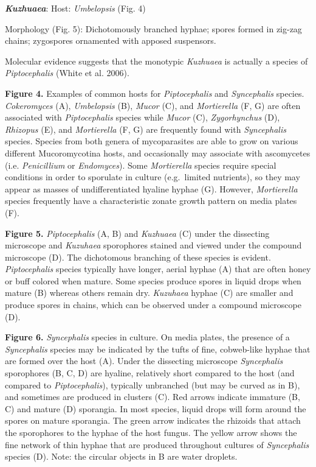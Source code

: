 \documentclass[]{book}
\begin{document}
\textbf{\emph{Kuzhuaea}}: Host: \emph{Umbelopsis} (Fig. 4)

Morphology (Fig. 5): Dichotomously branched hyphae; spores formed in
zig-zag chains; zygospores ornamented with apposed suspensors.

Molecular evidence suggests that the monotypic \emph{Kuzhuaea} is
actually a species of \emph{Piptocephalis} (White et al. 2006).

\textbf{Figure 4.} Examples of common hosts for \emph{Piptocephalis} and
\emph{Syncephalis} species. \emph{Cokeromyces} (A), \emph{Umbelopsis}
(B), \emph{Mucor} (C), and \emph{Mortierella} (F, G) are often
associated with \emph{Piptocephalis} species while \emph{Mucor} (C),
\emph{Zygorhynchus} (D), \emph{Rhizopus} (E), and \emph{Mortierella} (F,
G) are frequently found with \emph{Syncephalis} species. Species from
both genera of mycoparasites are able to grow on various different
Mucoromycotina hosts, and occasionally may associate with ascomycetes
(i.e. \emph{Penicillium} or \emph{Endomyces}). Some \emph{Mortierella}
species require special conditions in order to sporulate in culture
(e.g.~limited nutrients), so they may appear as masses of
undifferentiated hyaline hyphae (G). However, \emph{Mortierella} species
frequently have a characteristic zonate growth pattern on media plates
(F).

\textbf{Figure 5.} \emph{Piptocephalis} (A, B) and \emph{Kuzhuaea} (C)
under the dissecting microscope and \emph{Kuzuhaea} sporophores stained
and viewed under the compound microscope (D). The dichotomous branching
of these species is evident. \emph{Piptocephalis} species typically have
longer, aerial hyphae (A) that are often honey or buff colored when
mature. Some species produce spores in liquid drops when mature (B)
whereas others remain dry. \emph{Kuzuhaea} hyphae (C) are smaller and
produce spores in chains, which can be observed under a compound
microscope (D).

\textbf{Figure 6.} \emph{Syncephalis} species in culture. On media
plates, the presence of a \emph{Syncephalis} species may be indicated by
the tufts of fine, cobweb-like hyphae that are formed over the host (A).
Under the dissecting microscope \emph{Syncephalis} sporophores (B, C, D)
are hyaline, relatively short compared to the host (and compared to
\emph{Piptocephalis}), typically unbranched (but may be curved as in B),
and sometimes are produced in clusters (C). Red arrows indicate immature
(B, C) and mature (D) sporangia. In most species, liquid drops will form
around the spores on mature sporangia. The green arrow indicates the
rhizoids that attach the sporophores to the hyphae of the host fungus.
The yellow arrow shows the fine network of thin hyphae that are produced
throughout cultures of \emph{Syncephalis} species (D). Note: the
circular objects in B are water droplets.
\end{document}
